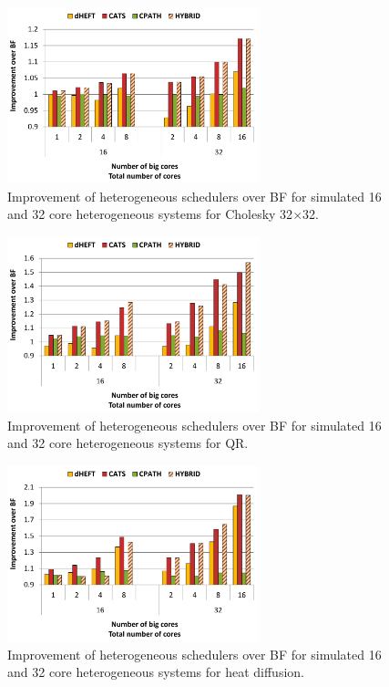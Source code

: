 \begin{figure}[!t]
	\centering
  		\includegraphics[width=0.65\textwidth]{figures/cholesky_TS_tall.pdf}
		\caption{Improvement of heterogeneous schedulers over BF for simulated 16 and 32 core heterogeneous systems for Cholesky 32$\times$32.}
  		\label{cholesky_ts}
\end{figure}
\begin{figure}[h]
	\centering
	\includegraphics[width=0.65\textwidth]{figures/QR_TS_tall.pdf}
	\caption{Improvement of heterogeneous schedulers over BF for simulated 16 and 32 core heterogeneous systems for QR.}
	\label{qr_ts}
	
\end{figure}
\begin{figure}
	\centering
  		\includegraphics[width=0.65\textwidth]{figures/heat_TS_tall.pdf}
  		\caption{Improvement of heterogeneous schedulers over BF for simulated 16 and 32 core heterogeneous systems for heat diffusion.}
  		\label{heat_ts}
\end{figure}
